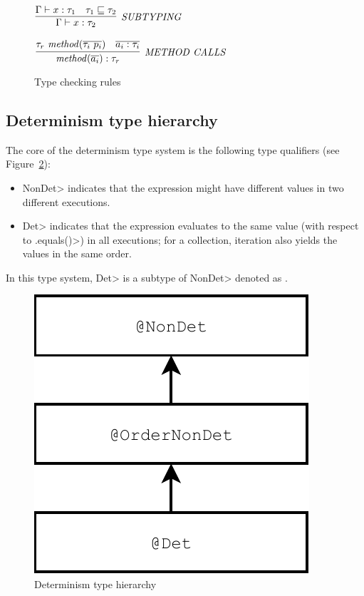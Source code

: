 \begin{figure}
    $\infer[\sc{\mathit{SUBTYPING}}]{\Gamma \vdash x : \tau_2}{\Gamma \vdash x : \tau_1 & \tau_1 \sqsubseteq \tau_2}$
    
    \bigskip
    
    $\infer[\sc{\mathit{METHOD \ CALLS}}]{\mathit{method}(\overline{a_i}) : \tau_r}{\tau_r \  \mathit{method}(\overline{\tau_i \  p_i}) & \overline{a_i : \tau_i}}$
    
    \caption{Type checking rules}
    \label{typecheck-rules}
\end{figure}

\subsection{Determinism type hierarchy}\label{type-hierarchy}
The core of the determinism type system is the following type qualifiers (see Figure~\ref{fig-determinism-hierarchy}):
\begin{itemize}
    \item \<NonDet> indicates
    that the expression might have different values in two different executions.
    \item \<Det> indicates that
    the expression evaluates to the same value (with respect to \<.equals()>) in all
    executions; for a collection, iteration also yields the values in the same
    order.
\end{itemize}

In this type system, \<Det> is a subtype of \<NonDet> denoted as .

\begin{figure}
    \begin{center}
        \includegraphics[scale=0.5]{determinism}
    \end{center}
    \caption{Determinism type hierarchy}
    \label{fig-determinism-hierarchy}
\end{figure}

